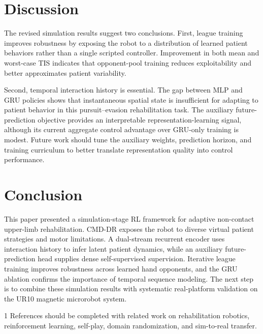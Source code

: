 \documentclass[lettersize,journal]{IEEEtran}
\begin{document}
\section{Discussion}
The revised simulation results suggest two conclusions. First, league training improves robustness by exposing the robot to a distribution of learned patient behaviors rather than a single scripted controller. Improvement in both mean and worst-case TIS indicates that opponent-pool training reduces exploitability and better approximates patient variability.

Second, temporal interaction history is essential. The gap between MLP and GRU policies shows that instantaneous spatial state is insufficient for adapting to patient behavior in this pursuit--evasion rehabilitation task. The auxiliary future-prediction objective provides an interpretable representation-learning signal, although its current aggregate control advantage over GRU-only training is modest. Future work should tune the auxiliary weights, prediction horizon, and training curriculum to better translate representation quality into control performance.

\section{Conclusion}
This paper presented a simulation-stage RL framework for adaptive non-contact upper-limb rehabilitation. CMD-DR exposes the robot to diverse virtual patient strategies and motor limitations. A dual-stream recurrent encoder uses interaction history to infer latent patient dynamics, while an auxiliary future-prediction head supplies dense self-supervised supervision. Iterative league training improves robustness across learned hand opponents, and the GRU ablation confirms the importance of temporal sequence modeling. The next step is to combine these simulation results with systematic real-platform validation on the UR10 magnetic microrobot system.

\balance
\begin{thebibliography}{1}
References should be completed with related work on rehabilitation robotics, reinforcement learning, self-play, domain randomization, and sim-to-real transfer.
\end{thebibliography}
\end{document}
